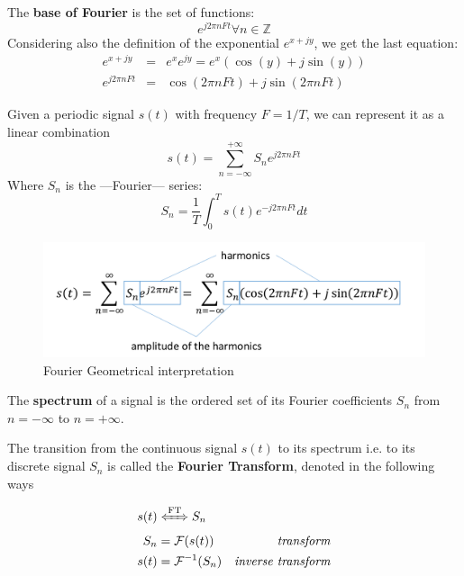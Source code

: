 The \textbf{base of Fourier} is the set of functions:
\begin{equation}
   e^{j2\pi n F t} \forall n \in \mathbb{Z}
\end{equation}
Considering also the definition of the exponential $e^{x + jy}$, we get the last equation:
\begin{align}
   e^{x + jy} & = & e^x e^{jy} =e^x(\cos(y) + j\sin(y))\\
   e^{j2\pi n F t} & = & \cos(2\pi n F t) + j\sin(2\pi n F t)
\end{align}
\nl


\newpage
\begin{definition}
   Given a periodic signal $s(t)$ with frequency $F = 1/T$, we can represent it as a linear combination
   \begin{equation}
      s(t) = \sum_{n=-\infty}^{+\infty} S_n e^{j2\pi n F t}
   \end{equation} 
   Where $S_n$ is the ---Fourier--- series:
   \begin{equation}
      S_n = \frac{1}{T} \int_0^T s(t) e^{-j2\pi n F t} dt
   \end{equation}
\end{definition}

\begin{figure}[htbp]
   \centering
   \includegraphics{images/fourier_geometric.png}
   \caption{Fourier Geometrical interpretation}
   \label{fig:fourier_geometric}
\end{figure}

\begin{definition}
   The \textbf{spectrum} of a signal is the ordered set of its Fourier coefficients $S_n$ from $n = -\infty$ to $n = +\infty$.
\end{definition}

\begin{definition}
   The transition from the continuous signal $s(t)$ to its spectrum i.e. to its discrete signal $S_n$ is called the \textbf{Fourier Transform}, denoted in the following ways

   \begin{align}
      s(t) & \xLeftrightarrow{\text{FT}} S_n\\
      S_n & = \mathcal{F}(s(t)) & \textit{transform}\\
      s(t) & = \mathcal{F}^{-1}(S_n) & \textit{inverse transform}
   \end{align}
\end{definition}

